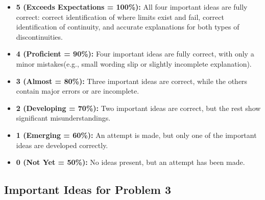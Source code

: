 \documentclass[11pt]{article}
\begin{document}
\begin{itemize}
    \item \textbf{5 (Exceeds Expectations = 100\%):}  
    All four important ideas are fully correct: correct identification of where limits exist and fail, correct identification of continuity, and accurate explanations for both types of discontinuities.

    \item \textbf{4 (Proficient = 90\%):}  
    Four important ideas are fully correct, with only a minor mistakes(e.g., small wording slip or slightly incomplete explanation).

    \item \textbf{3 (Almost = 80\%):}  
    Three important ideas are correct, while the others contain major errors or are incomplete.

    \item \textbf{2 (Developing = 70\%):}  
    Two important ideas are correct, but the rest show significant misunderstandings.

    \item \textbf{1 (Emerging = 60\%):}  
    An attempt is made, but only one of the important ideas are developed correctly.

    \item \textbf{0 (Not Yet = 50\%):}  
    No ideas present, but an attempt has been made.
\end{itemize}
\newpage
\subsection*{Important Ideas for Problem 3}
\end{document}
